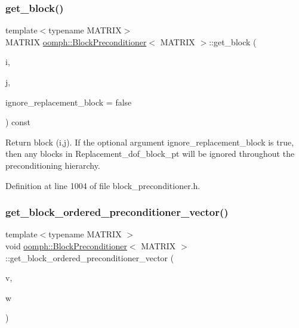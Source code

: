 \subsubsection{\texorpdfstring{get\+\_\+block()}{get\_block()}\hspace{0.1cm}{\footnotesize\ttfamily [2/2]}}
{\footnotesize\ttfamily template$<$typename M\+A\+T\+R\+IX$>$ \\
M\+A\+T\+R\+IX \hyperlink{classoomph_1_1BlockPreconditioner}{oomph\+::\+Block\+Preconditioner}$<$ M\+A\+T\+R\+IX $>$\+::get\+\_\+block (\begin{DoxyParamCaption}\item[{const unsigned \&}]{i,  }\item[{const unsigned \&}]{j,  }\item[{const bool \&}]{ignore\+\_\+replacement\+\_\+block = {\ttfamily false} }\end{DoxyParamCaption}) const\hspace{0.3cm}{\ttfamily [inline]}}



Return block (i,j). If the optional argument ignore\+\_\+replacement\+\_\+block is true, then any blocks in Replacement\+\_\+dof\+\_\+block\+\_\+pt will be ignored throughout the preconditioning hierarchy. 



Definition at line 1004 of file block\+\_\+preconditioner.\+h.

\mbox{\label{classoomph_1_1BlockPreconditioner_afd37323d2b5ba31e2d14f3ce8e6e474d}} 
\subsubsection{\texorpdfstring{get\+\_\+block\+\_\+ordered\+\_\+preconditioner\+\_\+vector()}{get\_block\_ordered\_preconditioner\_vector()}}
{\footnotesize\ttfamily template$<$typename M\+A\+T\+R\+IX $>$ \\
void \hyperlink{classoomph_1_1BlockPreconditioner}{oomph\+::\+Block\+Preconditioner}$<$ M\+A\+T\+R\+IX $>$\+::get\+\_\+block\+\_\+ordered\+\_\+preconditioner\+\_\+vector (\begin{DoxyParamCaption}\item[{const \hyperlink{classoomph_1_1DoubleVector}{Double\+Vector} \&}]{v,  }\item[{\hyperlink{classoomph_1_1DoubleVector}{Double\+Vector} \&}]{w }\end{DoxyParamCaption})}



